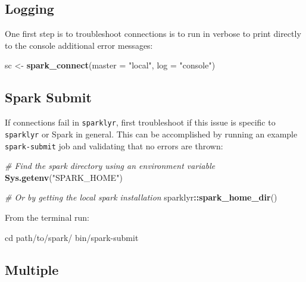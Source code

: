 \documentclass[]{book}
\newenvironment{Shaded}{\begin{snugshade}}{\end{snugshade}}
\newcommand{\BuiltInTok}[1]{#1}
\newcommand{\CommentTok}[1]{\textcolor[rgb]{0.56,0.35,0.01}{\textit{#1}}}
\newcommand{\DataTypeTok}[1]{\textcolor[rgb]{0.13,0.29,0.53}{#1}}
\newcommand{\ExtensionTok}[1]{#1}
\newcommand{\KeywordTok}[1]{\textcolor[rgb]{0.13,0.29,0.53}{\textbf{#1}}}
\newcommand{\NormalTok}[1]{#1}
\newcommand{\OperatorTok}[1]{\textcolor[rgb]{0.81,0.36,0.00}{\textbf{#1}}}
\newcommand{\StringTok}[1]{\textcolor[rgb]{0.31,0.60,0.02}{#1}}
\theoremstyle{definition}
\theoremstyle{definition}
\theoremstyle{definition}
\theoremstyle{remark}
\begin{document}
\hypertarget{logging}{%
\subsection{Logging}\label{logging}}

One first step is to troubleshoot connections is to run in verbose to
print directly to the console additional error messages:

\begin{Shaded}
\begin{Highlighting}[]
\NormalTok{sc <-}\StringTok{ }\KeywordTok{spark_connect}\NormalTok{(}\DataTypeTok{master =} \StringTok{"local"}\NormalTok{, }\DataTypeTok{log =} \StringTok{"console"}\NormalTok{)}
\end{Highlighting}
\end{Shaded}

\hypertarget{troubleshoot-spark-submit}{%
\subsection{Spark Submit}\label{troubleshoot-spark-submit}}

If connections fail in \texttt{sparklyr}, first troubleshoot if this
issue is specific to \texttt{sparklyr} or Spark in general. This can be
accomplished by running an example \texttt{spark-submit} job and
validating that no errors are thrown:

\begin{Shaded}
\begin{Highlighting}[]
\CommentTok{# Find the spark directory using an environment variable}
\KeywordTok{Sys.getenv}\NormalTok{(}\StringTok{"SPARK_HOME"}\NormalTok{)}

\CommentTok{# Or by getting the local spark installation}
\NormalTok{sparklyr}\OperatorTok{::}\KeywordTok{spark_home_dir}\NormalTok{()}
\end{Highlighting}
\end{Shaded}

From the terminal run:

\begin{Shaded}
\begin{Highlighting}[]
\BuiltInTok{cd}\NormalTok{ path/to/spark/}
\ExtensionTok{bin/spark-submit} 
\end{Highlighting}
\end{Shaded}

\hypertarget{multiple}{%
\subsection{Multiple}\label{multiple}}
\end{document}
